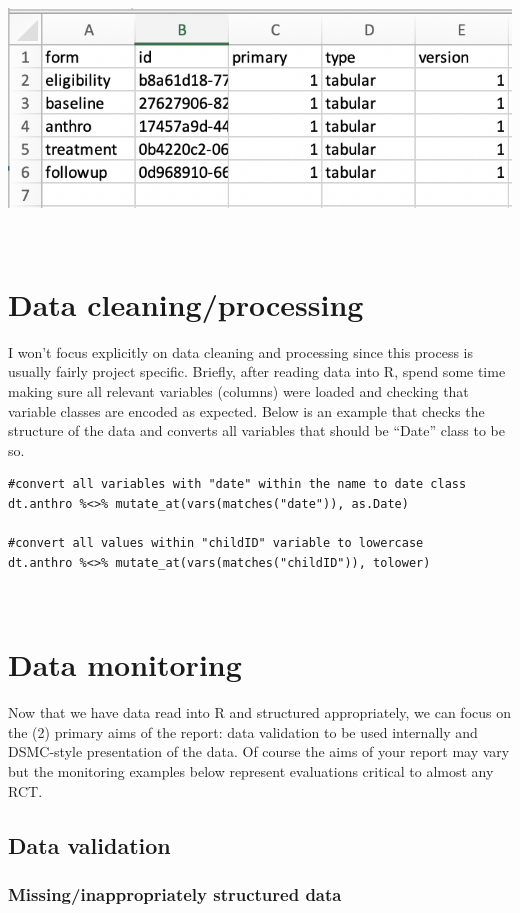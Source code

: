 \documentclass[
]{book}
\begin{document}
\includegraphics[width=0.6\linewidth,height=0.4\textheight]{images/report-images/api_meta}

\(~\)

\section{Data cleaning/processing}\label{data-cleaningprocessing}

I won't focus explicitly on data cleaning and processing since this process is usually fairly project specific. Briefly, after reading data into R, spend some time making sure all relevant variables (columns) were loaded and checking that variable classes are encoded as expected. Below is an example that checks the structure of the data and converts all variables that should be ``Date'' class to be so.

\begin{verbatim}
#convert all variables with "date" within the name to date class
dt.anthro %<>% mutate_at(vars(matches("date")), as.Date)

#convert all values within "childID" variable to lowercase
dt.anthro %<>% mutate_at(vars(matches("childID")), tolower)
\end{verbatim}

\(~\)

\section{Data monitoring}\label{data-monitoring}

Now that we have data read into R and structured appropriately, we can focus on the (2) primary aims of the report: data validation to be used internally and DSMC-style presentation of the data. Of course the aims of your report may vary but the monitoring examples below represent evaluations critical to almost any RCT.

\subsection{Data validation}\label{data-validation}

\subsubsection{Missing/inappropriately structured data}\label{missinginappropriately-structured-data}
\end{document}
